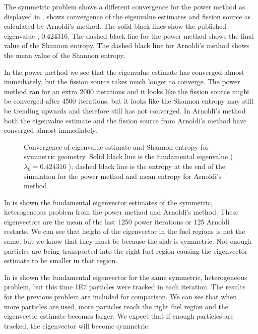 The symmetric problem shows a different convergence for the power method as displayed in .   shows convergence of the eigenvalue estimates and fission source as calculated by Arnoldi's method.  The solid black lines show the published eigenvalue \cite{Kornreich:2002Semi--0}, 0.424316.  The dashed black line for the power method shows the final value of the Shannon entropy.  The dashed black line for Arnoldi's method shows the mean value of the Shannon entropy.

In the power method we see that the eigenvalue estimate has converged almost immediately, but the fission source takes much longer to converge.  The power method ran for an extra 2000 iterations and it looks like the fission source might be converged after 4500 iterations, but it looks like the Shannon entropy may still be trending upwards and therefore still has not converged.  In Arnoldi's method both the eigenvalue estimate and the fission source from Arnoldi's method have converged almost immediately.

\begin{figure}[p]\centering

    \caption{Convergence of eigenvalue estimate and Shannon entropy for symmetric geometry.  Solid black line is the fundamental eigenvalue ($\lambda_0 = 0.424316$ \cite{Kornreich:2002Semi--0}); dashed black line is the entropy at the end of the simulation for the power method and mean entropy for Arnoldi's method.}
\end{figure}

In  is shown the fundamental eigenvector estimates of the symmetric, heterogeneous problem from the power method and Arnoldi's method.  These eigenvectors are the mean of the last 1250 power iterations or 125 Arnoldi restarts.  We can see that height of the eigenvector in the fuel regions is not the same, but we know that they must be because the slab is symmetric.  Not enough particles are being transported into the right fuel region causing the eigenvector estimate to be smaller in that region.  

In  is shown the fundamental eigenvector for the same symmetric, heterogeneous problem, but this time 1E7 particles were tracked in each iteration.  The results for the previous problem are included for comparison.  We can see that when more particles are used, more particles reach the right fuel region and the eigenvector estimate becomes larger.  We expect that if enough particles are tracked, the eigenvector will become symmetric.  


